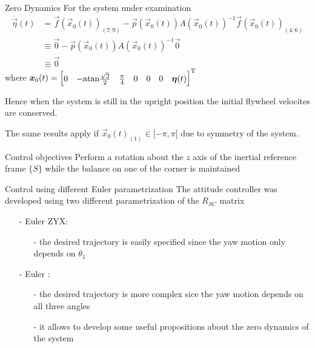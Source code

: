 \begin{frame}{Zero Dynamics \cubli}
  For the system under examination
  \[
  \begin{split}
    \dot{\vec{\eta}}(t) &= \vec{f}(\vec{x}_{0}(t))_{(7:9)} - \vec{p}
    (\vec{x}_{0}(t))A(\vec{x}_{0}(t))^{-1}  \vec{f}(\vec{x}_{0}(t))_{(4:6)}\\
    &\equiv \vec{0} - \vec{p}
    (\vec{x}_{0}(t))A(\vec{x}_{0}(t))^{-1}  \vec{0}\\
    &\equiv \vec{0}
  \end{split}
  \]
  where $\boldsymbol{x}_{0}(t)=
  \begin{bmatrix}
    0 & -\mathrm{atan}\frac{\sqrt{2}}{2} & \frac{\pi}{4} & 0 & 0 & 0 &
    \boldsymbol{\eta}(t)
  \end{bmatrix}^{\mathrm{T}}
  $
  \par
  Hence when the system is still in the upright position the initial flywheel velocites
  are conserved.
  \par
  The same results apply if $\vec{x}_{0}(t)_{(1)} \in [-\pi, \pi[$ due to symmetry of the system.
\end{frame}

\begin{frame}{Control objectives}
  Perform a rotation about the $z$ axis of the inertial
  reference frame $\{S\}$ while the balance on one of the corner is maintained
  \begin{center}
  \end{center}
\end{frame}

\begin{frame}{Control using different Euler parametrization}
  The attitude controller was developed using two different parametrization of the $R_{SC}$ matrix
  \begin{itemize}
  \item[-] Euler ZYX:  
    \begin{itemize}
    \item[-] the desired trajectory is easily specified since the yaw motion \alert{only} depends on $\theta_1$
    \end{itemize}
  \item[-] Euler \color{red}{XYZ}:
    \begin{itemize}
    \item[-] the desired trajectory is more complex sice the yaw motion depends on  \alert{all} three angles
    \item[-] it allows to develop some useful propositions about the zero dynamics of the system
    \end{itemize}
  \end{itemize}
\end{frame}

